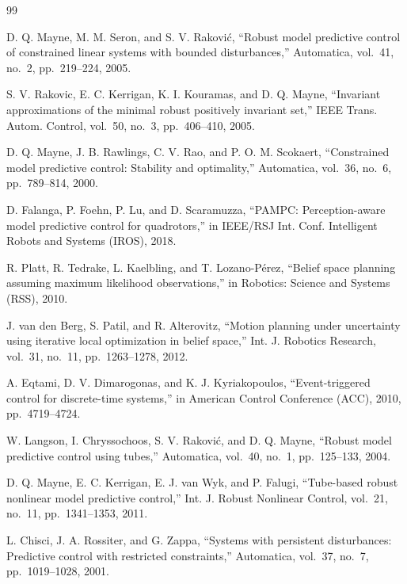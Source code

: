 \documentclass[letterpaper, 10 pt, conference]{ieeeconf}  %
\begin{document}
\begin{thebibliography}{99}

 D. Q. Mayne, M. M. Seron, and S. V. Rakovi\'c,
``Robust model predictive control of constrained linear systems with bounded
disturbances,'' {Automatica}, vol.~41, no.~2, pp.~219--224, 2005.

 S. V. Rakovic, E. C. Kerrigan, K. I. Kouramas, and D. Q. Mayne,
``Invariant approximations of the minimal robust positively invariant set,''
{IEEE Trans. Autom. Control}, vol.~50, no.~3, pp.~406--410, 2005.

 D. Q. Mayne, J. B. Rawlings, C. V. Rao, and
P. O. M. Scokaert, ``Constrained model predictive control: Stability and
optimality,'' {Automatica}, vol.~36, no.~6, pp.~789--814, 2000.

 D. Falanga, P. Foehn, P. Lu, and D. Scaramuzza,
``PAMPC: Perception-aware model predictive control for quadrotors,'' in
{IEEE/RSJ Int. Conf. Intelligent Robots and Systems (IROS)}, 2018.

 R. Platt, R. Tedrake, L. Kaelbling, and
T. Lozano-P\'erez, ``Belief space planning assuming maximum likelihood
observations,'' in {Robotics: Science and Systems (RSS)}, 2010.

 J. van den Berg, S. Patil, and R. Alterovitz,
``Motion planning under uncertainty using iterative local optimization in belief
space,'' {Int. J. Robotics Research}, vol.~31, no.~11, pp.~1263--1278, 2012.

 A. Eqtami, D. V. Dimarogonas, and K. J. Kyriakopoulos,
``Event-triggered control for discrete-time systems,'' in {American Control
Conference (ACC)}, 2010, pp.~4719--4724.

 W. Langson, I. Chryssochoos, S. V. Rakovi\'c, and D. Q. Mayne,
``Robust model predictive control using tubes,'' {Automatica}, vol.~40, no.~1,
pp.~125--133, 2004.

 D. Q. Mayne, E. C. Kerrigan, E. J. van Wyk, and P. Falugi,
``Tube-based robust nonlinear model predictive control,'' {Int. J. Robust Nonlinear
Control}, vol.~21, no.~11, pp.~1341--1353, 2011.

 L. Chisci, J. A. Rossiter, and G. Zappa, ``Systems with
persistent disturbances: Predictive control with restricted constraints,'' {Automatica},
vol.~37, no.~7, pp.~1019--1028, 2001.


\end{thebibliography}
\end{document}
